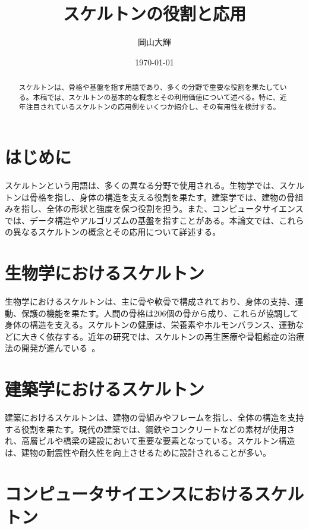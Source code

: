 \documentclass[lualatex, article]{jlreq}
\title{スケルトンの役割と応用}
\author{岡山大輝}
\date{\today}
\begin{document}
\maketitle{}

\begin{abstract}
  スケルトンは、骨格や基盤を指す用語であり、多くの分野で重要な役割を果たしている。本稿では、スケルトンの基本的な概念とその利用価値について述べる。特に、近年注目されているスケルトンの応用例をいくつか紹介し、その有用性を検討する。
\end{abstract}

\section{はじめに}

スケルトンという用語は、多くの異なる分野で使用される。生物学では、スケルトンは骨格を指し、身体の構造を支える役割を果たす。建築学では、建物の骨組みを指し、全体の形状と強度を保つ役割を担う。また、コンピュータサイエンスでは、データ構造やアルゴリズムの基盤を指すことがある。本論文では、これらの異なるスケルトンの概念とその応用について詳述する。

\section{生物学におけるスケルトン}

生物学におけるスケルトンは、主に骨や軟骨で構成されており、身体の支持、運動、保護の機能を果たす。人間の骨格は206個の骨から成り、これらが協調して身体の構造を支える。スケルトンの健康は、栄養素やホルモンバランス、運動などに大きく依存する。近年の研究では、スケルトンの再生医療や骨粗鬆症の治療法の開発が進んでいる~\cite{okayama2024how}。

\section{建築学におけるスケルトン}

建築におけるスケルトンは、建物の骨組みやフレームを指し、全体の構造を支持する役割を果たす。現代の建築では、鋼鉄やコンクリートなどの素材が使用され、高層ビルや橋梁の建設において重要な要素となっている。スケルトン構造は、建物の耐震性や耐久性を向上させるために設計されることが多い。

\section{コンピュータサイエンスにおけるスケルトン}
\end{document}
